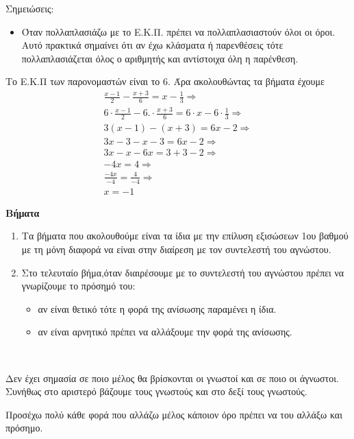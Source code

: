 Σημειώσεις:
\begin{itemize}	
\item Όταν πολλαπλασιάζω με το Ε.Κ.Π. πρέπει να πολλαπλασιαστούν όλοι οι όροι. Αυτό πρακτικά σημαίνει ότι αν έχω κλάσματα ή παρενθέσεις τότε πολλαπλασιάζεται όλος ο αριθμητής και αντίστοιχα όλη η παρένθεση.
\end{itemize}
Το Ε.Κ.Π των παρονομαστών είναι το $ 6 $. Άρα ακολουθώντας τα βήματα έχουμε
\begin{gather*}
\frac{x-1}{2}-\frac{x+3}{6}=x-\frac{1}{3}\Rightarrow\\
6\cdot\frac{x-1}{2}-6.\cdot\frac{x+3}{6}=6\cdot x-6\cdot\frac{1}{3}\Rightarrow\\
3(x-1)-(x+3) =6 x-2 \Rightarrow\\ 
3 x-3-x-3 =6 x-2 \Rightarrow\\
3 x-x-6 x =3+3-2 \Rightarrow\\
-4 x =4 \Rightarrow\\
\frac{-4 x}{-4}=\frac{4}{-4}\Rightarrow\\
x=-1
\end{gather*}
\begin{Methodos}{9cm}
\textbf{Βήματα}
\begin{enumerate}[itemsep=0mm]
\item Τα βήματα που ακολουθούμε είναι τα ίδια με την επίλυση εξισώσεων 1ου βαθμού με τη μόνη διαφορά να είναι στην διαίρεση με τον συντελεστή του αγνώστου.
\item Στο τελευταίο βήμα,όταν διαιρέσουμε με το συντελεστή του αγνώστου πρέπει να γνωρίζουμε το πρόσημό του:
\begin{itemize}
\item αν είναι θετικό τότε η φορά της ανίσωσης παραμένει η ίδια.
\item αν είναι αρνητικό πρέπει να αλλάξουμε την φορά της ανίσωσης.
\end{itemize}
\end{enumerate}
\end{Methodos}
\lysh\\
\begin{parat}{5cm}
Δεν έχει σημασία σε ποιο μέλος θα βρίσκονται οι γνωστοί και σε ποιο οι άγνωστοι. Συνήθως στο αριστερό βάζουμε τους γνωστούς και στο δεξί τους γνωστούς.
\end{parat}
\begin{prosoxi}{5cm}
Προσέχω πολύ κάθε φορά που αλλάζω μέλος κάποιον όρο πρέπει να του αλλάξω και πρόσημο.
\end{prosoxi}

